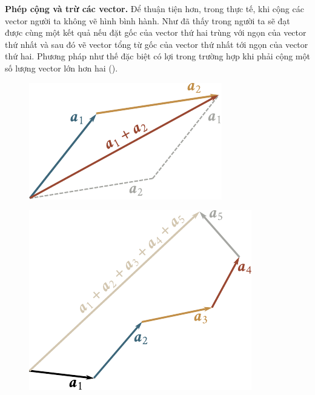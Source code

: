 \textbf{Phép cộng và trừ các vector.} Để thuận tiện hơn, trong thực tế, khi cộng các vector người ta không vẽ hình bình hành. Như đã thấy trong  người ta sẽ đạt được cùng một kết quả nếu đặt gốc của vector thứ hai trùng với ngọn của vector thứ nhất và sau đó vẽ vector tổng từ gốc của vector thứ nhất tới ngọn của vector thứ hai. Phương pháp như thế đặc biệt có lợi trong trường hợp khi phải cộng một số lượng vector lớn hơn hai ().

\begin{figure}[!htb]
	\begin{minipage}[t]{0.5\linewidth}
		\begin{center}
			\includegraphics[scale=0.95]{figures/ch_01/fig_1_5.pdf}
			\caption[]{}
			\label{fig:1_5}
		\end{center}
	\end{minipage}
	\hfill{ }%
	\begin{minipage}[t]{0.5\linewidth}
		\begin{center}
			\includegraphics[scale=0.95]{figures/ch_01/fig_1_6.pdf}
			\caption[]{}
			\label{fig:1_6}
		\end{center}
	\end{minipage}
\end{figure}

